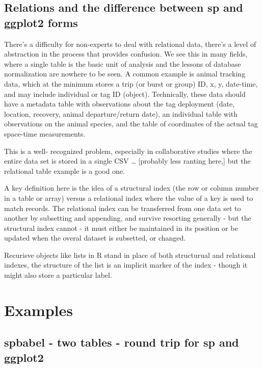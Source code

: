 \documentclass[]{book}
\begin{document}
\section{Relations and the difference between sp and ggplot2
forms}\label{relations-and-the-difference-between-sp-and-ggplot2-forms}

There's a difficulty for non-experts to deal with relational data,
there's a level of abstraction in the process that provides confusion.
We see this in many fields, where a single table is the basic unit of
analysis and the lessons of database normalization are nowhere to be
seen. A common example is animal tracking data, which at the minimum
stores a trip (or burst or group) ID, x, y, date-time, and may include
individual or tag ID (object). Technically, these data should have a
metadata table with observations about the tag deployment (date,
location, recovery, animal departure/return date), an individual table
with observations on the animal species, and the table of coordinates of
the actual tag space-time measurements.

This is a well- recognized problem, especially in collaborative studies
where the entire data set is stored in a single CSV \ldots{} {[}probably
less ranting here,{]} but the relational table example is a good one.

A key definition here is the idea of a structural index (the row or
column number in a table or array) versus a relational index where the
value of a key is used to match records. The relational index can be
transferred from one data set to another by subsetting and appending,
and survive resorting generally - but the structural index cannot - it
must either be maintained in its position or be updated when the overal
dataset is subsetted, or changed.

Recurisve objects like lists in R stand in place of both structurual and
relational indexes, the structure of the list is an implicit marker of
the index - though it might also store a particular label.

\chapter{Examples}\label{examples}

\section{spbabel - two tables - round trip for sp and
ggplot2}\label{spbabel---two-tables---round-trip-for-sp-and-ggplot2}
\end{document}
